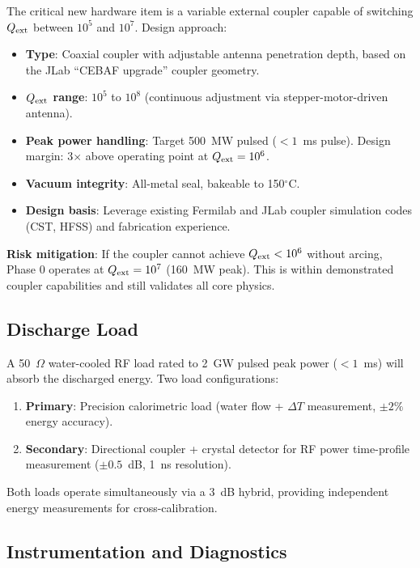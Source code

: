 \documentclass[11pt]{article}
\newcommand{\Qext}{Q_{\rm ext}}
\begin{document}
The critical new hardware item is a variable external coupler
capable of switching $\Qext$ between $10^5$ and $10^7$. Design
approach:

\begin{itemize}[nosep]
  \item \textbf{Type}: Coaxial coupler with adjustable antenna
    penetration depth, based on the JLab ``CEBAF upgrade'' coupler
    geometry.
  \item \textbf{$\Qext$ range}: $10^5$ to $10^8$ (continuous
    adjustment via stepper-motor-driven antenna).
  \item \textbf{Peak power handling}: Target 500~MW pulsed
    ($< 1$~ms pulse). Design margin: 3$\times$ above operating
    point at $\Qext = 10^6$.
  \item \textbf{Vacuum integrity}: All-metal seal, bakeable to
    150$^\circ$C.
  \item \textbf{Design basis}: Leverage existing Fermilab and JLab
    coupler simulation codes (CST, HFSS) and fabrication experience.
\end{itemize}

\textbf{Risk mitigation}: If the coupler cannot achieve $\Qext < 10^6$
without arcing, Phase 0 operates at $\Qext = 10^7$ (160~MW peak).
This is within demonstrated coupler capabilities and still validates
all core physics.

\subsection{Discharge Load}

A 50~$\Omega$ water-cooled RF load rated to 2~GW pulsed peak power
($< 1$~ms) will absorb the discharged energy. Two load
configurations:

\begin{enumerate}[nosep]
  \item \textbf{Primary}: Precision calorimetric load (water flow +
    $\Delta T$ measurement, $\pm 2\%$ energy accuracy).
  \item \textbf{Secondary}: Directional coupler + crystal detector
    for RF power time-profile measurement ($\pm 0.5$~dB, 1~ns
    resolution).
\end{enumerate}

Both loads operate simultaneously via a 3~dB hybrid, providing
independent energy measurements for cross-calibration.

\subsection{Instrumentation and Diagnostics}
\end{document}

